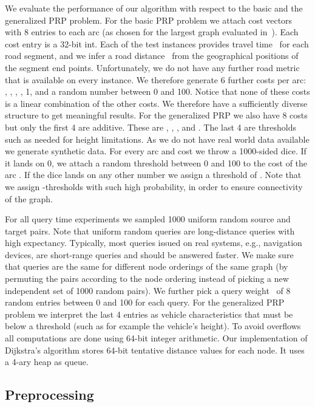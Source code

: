 \documentclass{sig-alternate}
\begin{document}
We evaluate the performance of our algorithm with respect to the basic and the generalized PRP problem.
For the basic PRP problem we attach cost vectors with 8 entries to each
arc (as chosen for the largest graph evaluated
in~\cite{fns-opca-14}). Each cost entry is a 32-bit int. 
Each of the test instances provides travel time~ for each road segment, and we infer a road distance~ from the geographical positions of the segment end points.
Unfortunately, we do not have any further road metric that is available on every instance.
We therefore generate 6 further costs per arc: , , , , 1, and a random number between 0 and 100. 
Notice that none of these costs is a linear combination of the other costs.
We therefore have a sufficiently diverse structure to get meaningful results. 
For the generalized PRP we also have 8 costs but only the first 4 are additive. 
These are , , , and . 
The last 4 are thresholds such as needed for height limitations.
As we do not have real world data available we generate synthetic data.
For every arc  and cost  we throw a 1000-sided dice. 
If it lands on 0, we attach a random threshold between 0 and 100 to the cost  of the arc . 
If the dice lands on any other number we assign a threshold of .
Note that we assign -thresholds with such high probability, in order to ensure connectivity of the graph. 

For all query time experiments we sampled 1000 uniform random source and target pairs. 
Note that uniform random queries are long-distance queries with high expectancy. Typically, most queries issued on real systems, e.g., navigation devices, are short-range queries and should be answered faster.
We make sure that queries are the same for different node orderings of the same graph (by permuting the pairs according
to the node ordering instead of picking a new independent set of 1000
random pairs). We further pick a query weight~ of 8 random entries between 0 and
100 for each query. For the generalized PRP problem we interpret the last 4 entries as vehicle characteristics that must be below a threshold (such as for example the vehicle's height).
To avoid overflows all computations are done using 64-bit integer arithmetic. Our implementation of Dijkstra's algorithm stores 64-bit tentative distance values for each node.
It uses a 4-ary heap as queue.

\subsection{Preprocessing}
\end{document}
